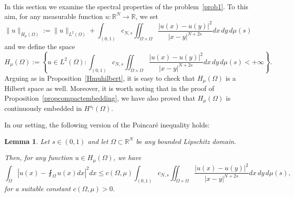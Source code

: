 \documentclass[12pt,a4paper,intlimits,sumlimits]{amsart}
\def \R {\mathbb{R}}
\theoremstyle{definition}
\theoremstyle{plain}
\newtheorem{lemma}[definition]{Lemma}
\numberwithin{equation}{section}
\renewcommand{\le}{\leqslant}
\begin{document}
In this section we examine the spectral properties of the problem~\eqref{prob1}. To this aim,  for any measurable function $u:\R^N\to\R$, we set
\begin{equation}\label{HMUNORM}
\|u\|_{H_\mu(\Omega)}:= \|u\|_{L^2(\Omega)} + \int_{(0, 1)} c_{N, s}\iint_{\Omega\times\Omega} \frac{|u(x)-u(y)|^2}{|x-y|^{N+2s}} dx\,dy \,d\mu(s)
\end{equation}
and we define the space
\[
H_\mu (\Omega):=\left\{u\in L^2(\Omega) : \int_{(0, 1)} c_{N, s}\iint_{\Omega\times\Omega} \frac{|u(x)-u(y)|^2}{|x-y|^{N+2s}} dx\,dy \,d\mu(s) <+\infty \right\}.
\]
Arguing as in Proposition~\ref{Hmuhilbert}, it is easy to check that $H_\mu(\Omega)$ is a Hilbert space as well. Moreover, it is worth noting that in the proof of Proposition~\ref{propcompactembedding}, we have also proved that $H_\mu(\Omega)$ is continuously embedded in $H^{s_\sharp}(\Omega)$.

In our setting, the following version of the Poincaré inequality holds:
\begin{lemma}\label{POINCARE}
Let $s\in (0, 1)$ and let $\Omega\subset\R^N$ be any bounded Lipschitz domain. 

Then, for any function $u\in H_\mu(\Omega)$, we have
\[
\int_\Omega \left|u(x)- \fint_\Omega u (x) dx \right|^2 dx \le c(\Omega, \mu) \int_{(0, 1)} c_{N,  s}\iint_{\Omega\times\Omega} \frac{|u(x)-u(y)|^2}{|x-y|^{N+2s}} dx\,dy\, d\mu(s),
\]
for a suitable constant $c(\Omega, \mu)>0$.
\end{lemma}
\end{document}
